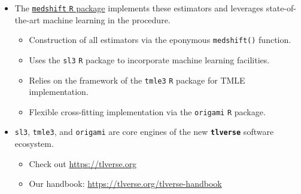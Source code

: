 \documentclass[landscape,a0paper,fontscale=0.285]{baposter} %
\newcommand{\compresslist}{ %
\setlength{\itemsep}{1pt}
\setlength{\parskip}{0pt}
\setlength{\parsep}{0pt}
}
\begin{document}
\begin{poster}
{\begin{itemize}\compresslist
  \setlength\itemsep{0.5em}
  \item The \underline{\texttt{medshift} \texttt{R} package}
    \cite{hejazi2019medshift} implements these estimators and leverages
    state-of-the-art machine learning in the procedure.
    \begin{itemize}
      \item Construction of all estimators via the eponymous \texttt{medshift()}
        function.
      \item Uses the \texttt{sl3} \texttt{R} package to incorporate machine
        learning facilities.
      \item Relies on the framework of the \texttt{tmle3} \texttt{R} package for
        TMLE implementation.
      \item Flexible cross-fitting implementation via the \texttt{origami}
        \texttt{R} package.
    \end{itemize}
  \item \texttt{sl3}, \texttt{tmle3}, and \texttt{origami} are core engines of
    the new \textbf{\texttt{tlverse}} software ecosystem.
    \begin{itemize}
      \item Check out \url{https://tlverse.org}
      \item Our handbook: \url{https://tlverse.org/tlverse-handbook}
    \end{itemize}
\end{itemize}
\vspace{0.05cm} %
}



\end{poster}
\end{document}
